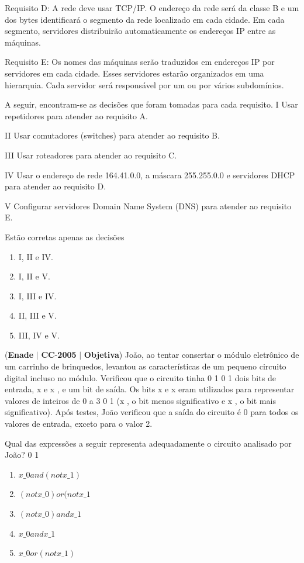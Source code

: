 \documentclass{exam}
\begin{document}
\begin{questions}
Requisito D: A rede deve usar TCP/IP. O endereço da rede será da
classe B e um dos bytes identificará o segmento da rede localizado em
cada cidade. Em cada segmento, servidores distribuirão
automaticamente os endereços IP entre as máquinas.

Requisito E: Os nomes das máquinas serão traduzidos em endereços
IP por servidores em cada cidade. Esses servidores estarão
organizados em uma hierarquia. Cada servidor será responsável por
um ou por vários subdomínios.

A seguir, encontram-se as decisões que foram tomadas para cada
requisito.
I Usar repetidores para atender ao requisito A.

II Usar comutadores (switches) para atender ao requisito B.

III Usar roteadores para atender ao requisito C.

IV Usar o endereço de rede 164.41.0.0, a máscara 255.255.0.0 e
servidores DHCP para atender ao requisito D.

V Configurar servidores Domain Name System (DNS) para
atender ao requisito E.

Estão corretas apenas as decisões
	\begin{enumerate}[label=\alph*)]
		\item  I, II e IV. 
		\item  I, II e V. 
		\item  I, III e IV.
		\item  II, III e V.
		\item  III, IV e V.
	\end{enumerate}

\question (\textbf{Enade} $|$ \textbf{CC}-\textbf{2005} $|$ \textbf{Objetiva})
João, ao tentar consertar o módulo eletrônico de um
carrinho de brinquedos, levantou as características de um pequeno
circuito digital incluso no módulo. Verificou que o circuito tinha
0 1 0 1
dois bits de entrada, x e x , e um bit de saída. Os bits x e x
eram utilizados para representar valores de inteiros de 0 a 3
0 1
(x , o bit menos significativo e x , o bit mais significativo).
Após testes, João verificou que a saída do circuito é 0 para
todos os valores de entrada, exceto para o valor 2.

Qual das expressões a seguir representa adequadamente o circuito
analisado por João?
0 1
	\begin{enumerate}[label=\alph*)]
		\item  $ x\_0 and (not x\_1 ) $
		\item  $ (not x\_0 ) or (not x\_1 $
		\item  $(not x\_0 ) and x\_1$
		\item  $x\_0 and x\_1$
		\item  $x\_0 or (not x\_1)$
	\end{enumerate}


\end{questions}
\end{document}
